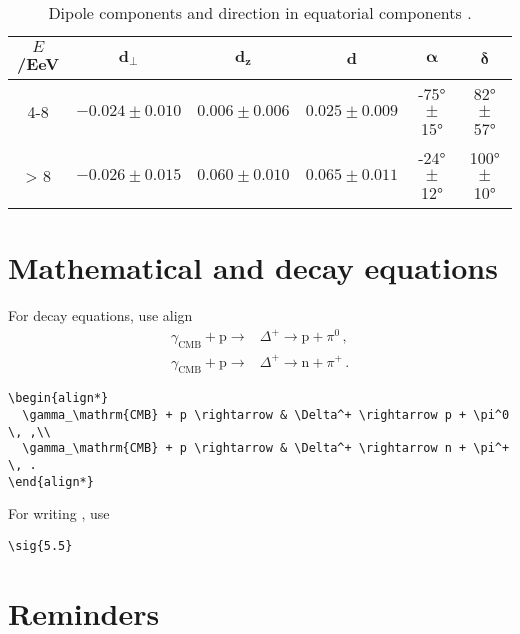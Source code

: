 \begin{table}[h]
  \caption{Dipole components and direction in equatorial components \cite{Mollerach2016_2}.}
  \centering
  \begin{tabular}{cccccc}
  \toprule
  \textbf{$E$/EeV} & $\boldsymbol{d_\perp}$ & $\boldsymbol{d_z}$ & $\boldsymbol d$ & $\boldsymbol\alpha$ & $\boldsymbol\delta$  \\
  \midrule
  4-8 &  $-0.024 \pm 0.010$ & $ 0.006
   \pm 0.006$ & $0.025 \pm 0.009$ & \ang{-75} $\pm$ \ang{15} & \phantom{0}\ang{82} $\pm$ \ang{57}\\
   > 8 & $-0.026 \pm 0.015$ &  $0.060 \pm 0.010$ & $0.065 \pm 0.011$ & \ang{-24} $\pm$ \ang{12} & \ang{100} $\pm$ \ang{10}\\
  \bottomrule
  \end{tabular}
  \label{tb:pao_dipole}
\end{table}



\section{Mathematical and decay equations}

For decay equations, use align
%
\begin{align*}
  \gamma_\mathrm{CMB} + \mathrm{p} \rightarrow & \Delta^+ \rightarrow \mathrm{p} + \pi^0 \, ,\\
  \gamma_\mathrm{CMB} + \mathrm{p} \rightarrow & \Delta^+ \rightarrow \mathrm{n} + \pi^+ \, .
\end{align*}
\begin{lstlisting}
\begin{align*}
  \gamma_\mathrm{CMB} + p \rightarrow & \Delta^+ \rightarrow p + \pi^0 \, ,\\
  \gamma_\mathrm{CMB} + p \rightarrow & \Delta^+ \rightarrow n + \pi^+ \, .
\end{align*}
\end{lstlisting}

For writing , use
%
\begin{lstlisting}
\sig{5.5} 
\end{lstlisting}



\section{Reminders}

